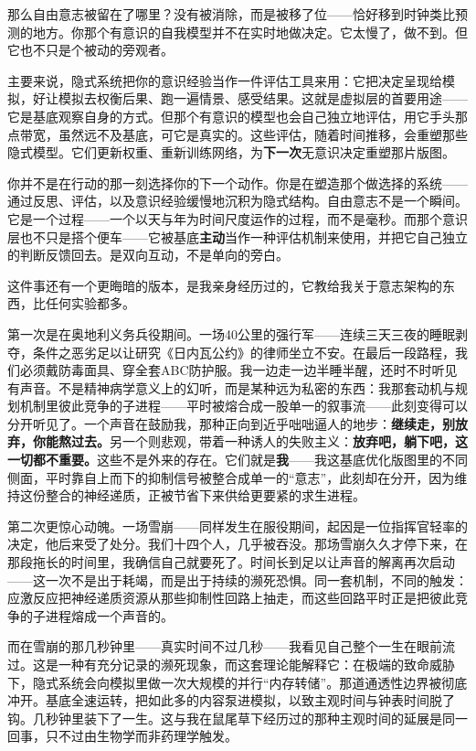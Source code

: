 \documentclass[11pt, twoside, openright]{book}
\begin{document}
那么自由意志被留在了哪里？没有被消除，而是被移了位------恰好移到时钟类比预测的地方。你那个有意识的自我模型并不在实时地做决定。它太慢了，做不到。但它也不只是个被动的旁观者。

主要来说，隐式系统把你的意识经验当作一件评估工具来用：它把决定呈现给模拟，好让模拟去权衡后果、跑一遍情景、感受结果。这就是虚拟层的首要用途------它是基底观察自身的方式。但那个有意识的模型也会自己独立地评估，用它手头那点带宽，虽然远不及基底，可它是真实的。这些评估，随着时间推移，会重塑那些隐式模型。它们更新权重、重新训练网络，为\textbf{下一次}无意识决定重塑那片版图。

你并不是在行动的那一刻选择你的下一个动作。你是在塑造那个做选择的系统------通过反思、评估，以及意识经验缓慢地沉积为隐式结构。自由意志不是一个瞬间。它是一个过程------一个以天与年为时间尺度运作的过程，而不是毫秒。而那个意识层也不只是搭个便车------它被基底\textbf{主动}当作一种评估机制来使用，并把它自己独立的判断反馈回去。是双向互动，不是单向的旁白。

这件事还有一个更晦暗的版本，是我亲身经历过的，它教给我关于意志架构的东西，比任何实验都多。

第一次是在奥地利义务兵役期间。一场40公里的强行军------连续三天三夜的睡眠剥夺，条件之恶劣足以让研究《日内瓦公约》的律师坐立不安。在最后一段路程，我们必须戴防毒面具、穿全套ABC防护服。我一边走一边半睡半醒，还时不时听见有声音。不是精神病学意义上的幻听，而是某种远为私密的东西：我那套动机与规划机制里彼此竞争的子进程------平时被熔合成一股单一的叙事流------此刻变得可以分开听见了。一个声音在鼓励我，那种正向到近乎咄咄逼人的地步：\textbf{继续走，别放弃，你能熬过去。}另一个则悲观，带着一种诱人的失败主义：\textbf{放弃吧，躺下吧，这一切都不重要。}这些不是外来的存在。它们就是\textbf{我}------我这基底优化版图里的不同侧面，平时靠自上而下的抑制信号被整合成单一的“意志”，此刻却在分开，因为维持这份整合的神经递质，正被节省下来供给更要紧的求生进程。

第二次更惊心动魄。一场雪崩------同样发生在服役期间，起因是一位指挥官轻率的决定，他后来受了处分。我们十四个人，几乎被吞没。那场雪崩久久才停下来，在那段拖长的时间里，我确信自己就要死了。时间长到足以让声音的解离再次启动------这一次不是出于耗竭，而是出于持续的濒死恐惧。同一套机制，不同的触发：应激反应把神经递质资源从那些抑制性回路上抽走，而这些回路平时正是把彼此竞争的子进程熔成一个声音的。

而在雪崩的那几秒钟里------真实时间不过几秒------我看见自己整个一生在眼前流过。这是一种有充分记录的濒死现象，而这套理论能解释它：在极端的致命威胁下，隐式系统会向模拟里做一次大规模的并行“内存转储”。那道通透性边界被彻底冲开。基底全速运转，把如此多的内容泵进模拟，以致主观时间与钟表时间脱了钩。几秒钟里装下了一生。这与我在鼠尾草下经历过的那种主观时间的延展是同一回事，只不过由生物学而非药理学触发。
\end{document}
